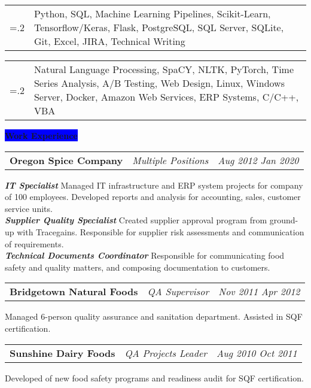 \documentclass[letterpaper,12pt]{article}[leftmargin=*]
\newcommand{\experience}[2]{\vspace{6pt}
  \colorbox{Blue}{\color{white}#1\hspace{9pt}\raggedbottom\normalsize\textbf{#2\hspace{4pt}}}
}
\newcommand{\resumeSectionStart}{\begin{itemize}[leftmargin=0.1in]}
\newcommand{\resumeSectionEnd}{\end{itemize}}
\newcommand{\resumeSkill}[2]{
  \vspace{-6pt}
  \item[]
    \begin{tabularx}{0.97\textwidth}{>{\hsize=.2\hsize}X X }
      {\textbf{#1}} & {\small#2} \\
    \end{tabularx}
}
\newcommand{\resumeExperience}[3]{
  \vspace{-6pt}
  \item[]
    \begin{tabularx}{0.97\textwidth}{>{\raggedright}X >{\raggedright\arraybackslash}X >{\raggedleft\arraybackslash}X}
      \textbf{\color{primary}#1} & \textit{\color{accent}#2} & \textit{\color{accent}\small#3} \\
  \end{tabularx}
    
}
\begin{document}
\resumeSectionStart{

  \resumeSkill{Proficient in}{Python, SQL, Machine Learning Pipelines, Scikit-Learn, Tensorflow/Keras, Flask, PostgreSQL, SQL Server, SQLite, Git, Excel, JIRA, Technical Writing}

  \resumeSkill{Familiar with}{Natural Language Processing, SpaCY, NLTK, PyTorch, Time Series Analysis, A/B Testing, Web Design, Linux, Windows Server, Docker, Amazon Web Services, ERP Systems, C/C++, VBA}


}
\resumeSectionEnd{}

\experience{\faPieChart}{Work Experience}

\resumeSectionStart{
  \resumeExperience{Oregon Spice Company}{Multiple Positions}{Aug 2012 \textemdash{} Jan 2020}
  \textbf{\textit{\color{accent}IT Specialist}} \textemdash{} Managed IT infrastructure and ERP system projects for company of 100 employees. Developed reports and analysis for accounting, sales, customer service units. \\
  \textbf{\textit{\color{accent}Supplier Quality Specialist}} \textemdash{} Created supplier approval program from ground-up with Tracegains. Responsible for supplier risk assessments and communication of requirements. \\
  \textbf{\textit{\color{accent}Technical Documents Coordinator}} \textemdash{} Responsible for communicating food safety and quality matters, and composing documentation to customers.
}
\vspace{-6pt}
\resumeSectionEnd{}

\resumeSectionStart{
  \resumeExperience{Bridgetown Natural Foods}{QA Supervisor}{Nov 2011 \textemdash{} Apr 2012}
  Managed 6-person quality assurance and sanitation department. Assisted in SQF certification.
}
\vspace{-6pt}
\resumeSectionEnd{}

\resumeSectionStart{
  \resumeExperience{Sunshine Dairy Foods}{QA Projects Leader}{Aug 2010 \textemdash{} Oct 2011}
  Developed of new food safety programs and readiness audit for SQF certification.
}
\vspace{-6pt}
\resumeSectionEnd{}
\end{document}
